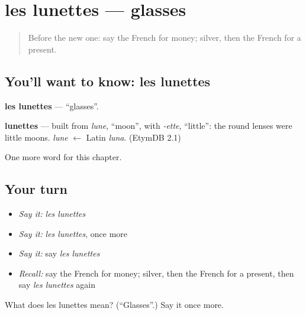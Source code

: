 \section[les lunettes]{les lunettes — glasses}

\label{lesson:FR-C79-lunettes}



\begin{quote}
Before the new one: say the French for money; silver, then the French for a present.
\end{quote}

\subsection*{You'll want to know: les lunettes}
\textbf{les lunettes} — \textquotedblleft{}glasses\textquotedblright{}.

\begin{cousinweb}
\textbf{lunettes} — built from \emph{lune}, \textquotedblleft{}moon\textquotedblright{}, with \emph{-ette}, \textquotedblleft{}little\textquotedblright{}: the round lenses were little moons. \emph{lune} $\leftarrow$ Latin \emph{luna}. (EtymDB 2.1)
\end{cousinweb}

\begin{grammarlens}[title={What you've built}]
One more word for this chapter.
\end{grammarlens}

\subsection*{Your turn}
\begin{itemize}
\raggedright
  \item \emph{Say it:} \emph{les lunettes}
  \item \emph{Say it:} \emph{les lunettes}, once more
  \item \emph{Say it:} say \emph{les lunettes}
  \item \emph{Recall:} say the French for money; silver, then the French for a present, then say \emph{les lunettes} again
\end{itemize}

\begin{tcolorbox}[breakable,colback=teal!4,colframe=teal!35!black,title={Before you move on}]
What does les lunettes mean? (\textquotedblleft{}Glasses\textquotedblright{}.) Say it once more.
\end{tcolorbox}
